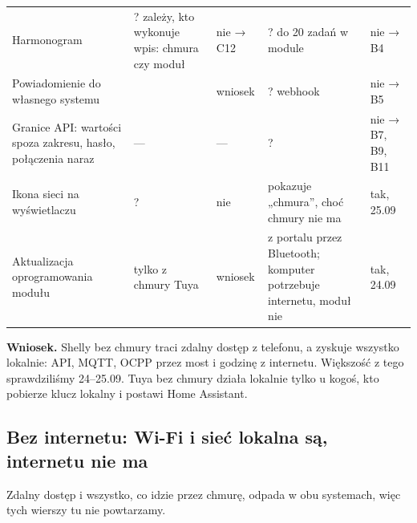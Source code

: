 \documentclass[11pt,a4paper]{article}
\begin{document}
\begin{longtable}{>{\raggedright\arraybackslash}p{3.39cm}>{\raggedright\arraybackslash}p{3.25cm}>{\raggedright\arraybackslash}p{2.35cm}>{\raggedright\arraybackslash}p{3.06cm}>{\raggedright\arraybackslash}p{2.35cm}}
Harmonogram & ? zależy, kto wykonuje wpis: chmura czy moduł & nie {\symbolfont→} C12 & ? do 20 zadań w module & nie {\symbolfont→} B4 \\
Powiadomienie do własnego systemu & \leavevmode{\symbolfont\color{apred}\textbf{✘}} & wniosek & ? webhook & nie {\symbolfont→} B5 \\
Granice API: wartości spoza zakresu, hasło, połączenia naraz & — & — & ? & nie {\symbolfont→} B7, B9, B11 \\
Ikona sieci na wyświetlaczu & ? & nie & \leavevmode{\symbolfont\color{apamber}\textbf{◐}} pokazuje „chmura”, choć chmury nie ma & tak, 25.09 \\
Aktualizacja oprogramowania modułu & \leavevmode{\symbolfont\color{apred}\textbf{✘}} tylko z chmury Tuya & wniosek & \leavevmode{\symbolfont\color{apamber}\textbf{◐}} z portalu przez Bluetooth; komputer potrzebuje internetu, moduł nie & tak, 24.09 \\
\end{longtable}

\textbf{Wniosek.} Shelly bez chmury traci zdalny dostęp z telefonu, a zyskuje wszystko lokalnie: API, MQTT, OCPP przez most i godzinę z internetu. Większość z tego sprawdziliśmy 24–25.09. Tuya bez chmury działa lokalnie tylko u kogoś, kto pobierze klucz lokalny i postawi Home Assistant.


\subsection{Bez internetu: Wi-Fi i sieć lokalna są, internetu nie ma}

Zdalny dostęp i wszystko, co idzie przez chmurę, odpada w obu systemach, więc tych wierszy tu nie powtarzamy.
\end{document}
